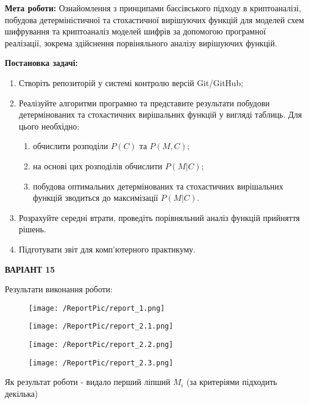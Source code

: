 \noindent\textbf{Мета роботи:} Ознайомлення з принципами баєсівського підходу в криптоаналізі, побудова детерміністичної та стохастичної 
вирішуючих функцій для моделей схем шифрування та криптоаналіз моделей шифрів за допомогою програмної реалізації, зокрема здійснення 
порвіняльного аналізу вирішуючих функцій.

\noindent\textbf{Постановка задачі:}
\begin{enumerate}
    \item Створіть репозиторій у системі контролю версій Git/GitHub;
    \item Реалізуйте алгоритми програмно та представите результати побудови детермінованих та стохастичних вирішальних функцій у 
        вигляді таблиць. Для цього необхідно:
        \begin{enumerate}
            \item обчислити розподіли $P(C)$ та $P(M, C)$;
            \item на основі цих розподілів обчислити $P(M \vert C)$;
            \item побудова оптимальних детермінованих та стохастичних вирішальних функцій зводиться до максимізації $P(M \vert C)$.
        \end{enumerate}
    \item Розрахуйте середні втрати, проведіть порівняльний аналіз функцій прийняття рішень.
    \item Підготувати звіт для комп'ютерного практикуму.
\end{enumerate}

\begin{center}
    \textbf{ВАРІАНТ 15}
\end{center}
Результати виконання роботи:
\begin{figure}[!ht]
        \centering
        \begin{minipage}{\linewidth}
            \texttt{[image: /ReportPic/report\_1.png]}
        \end{minipage}
\end{figure}
\begin{figure}[!ht]
        \centering
        \begin{minipage}{\linewidth}
            \texttt{[image: /ReportPic/report\_2.1.png]}
        \end{minipage}
        \begin{minipage}{\linewidth}
            \texttt{[image: /ReportPic/report\_2.2.png]}
        \end{minipage}
        \centering
        \begin{minipage}{\linewidth}
            \texttt{[image: /ReportPic/report\_2.3.png]}
        \end{minipage}
\end{figure}

Як результат роботи - видало перший ліпший $M_{i}$ (за критеріями підходить декілька)